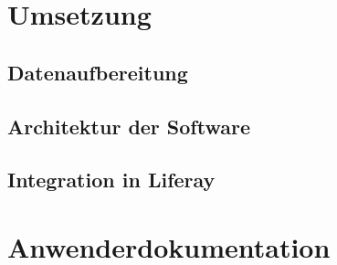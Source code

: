 \chapter{Umsetzung}

\section{Datenaufbereitung}
\section{Architektur der Software}
\section{Integration in Liferay}

\chapter{Anwenderdokumentation}

